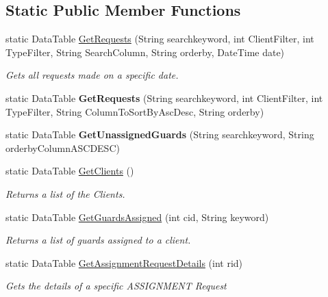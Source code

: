 \subsection*{Static Public Member Functions}
\begin{DoxyCompactItemize}
\item 
static Data\+Table \hyperlink{class_m_s_a_m_i_s_user_interface_1_1_scheduling_a510f2fb4c4bab2c0060b47f329c1a05c}{Get\+Requests} (String searchkeyword, int Client\+Filter, int Type\+Filter, String Search\+Column, String orderby, Date\+Time date)
\begin{DoxyCompactList}\small\item\em Gets all requests made on a specific date. \end{DoxyCompactList}\item 
\mbox{\label{class_m_s_a_m_i_s_user_interface_1_1_scheduling_ad957b4cd57182fcb572765be14d7bacb}} 
static Data\+Table {\bfseries Get\+Requests} (String searchkeyword, int Client\+Filter, int Type\+Filter, String Column\+To\+Sort\+By\+Asc\+Desc, String orderby)
\item 
\mbox{\label{class_m_s_a_m_i_s_user_interface_1_1_scheduling_a1875cfb45a8a64b06eaa3740237d8dc4}} 
static Data\+Table {\bfseries Get\+Unassigned\+Guards} (String searchkeyword, String orderby\+Column\+A\+S\+C\+D\+E\+SC)
\item 
static Data\+Table \hyperlink{class_m_s_a_m_i_s_user_interface_1_1_scheduling_a94ddd9fb2b7b2f51815318f364c65f49}{Get\+Clients} ()
\begin{DoxyCompactList}\small\item\em Returns a list of the Clients. \end{DoxyCompactList}\item 
static Data\+Table \hyperlink{class_m_s_a_m_i_s_user_interface_1_1_scheduling_a18ab1d6c1e4cf5df9bbffc04cb138648}{Get\+Guards\+Assigned} (int cid, String keyword)
\begin{DoxyCompactList}\small\item\em Returns a list of guards assigned to a client. \end{DoxyCompactList}\item 
static Data\+Table \hyperlink{class_m_s_a_m_i_s_user_interface_1_1_scheduling_aa43df3f46aa587e9d2ffb7013fe8ab14}{Get\+Assignment\+Request\+Details} (int rid)
\begin{DoxyCompactList}\small\item\em Gets the details of a specific A\+S\+S\+I\+G\+N\+M\+E\+NT Request \end{DoxyCompactList}\item 

\end{DoxyCompactItemize}
